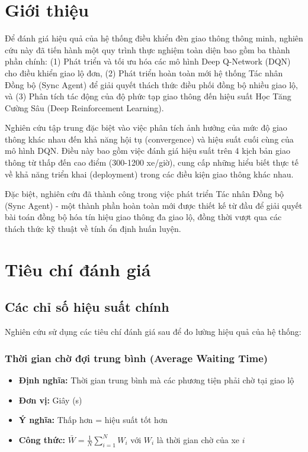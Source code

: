 \section{Giới thiệu}

Để đánh giá hiệu quả của hệ thống điều khiển đèn giao thông thông minh, nghiên
cứu này đã tiến hành một quy trình thực nghiệm toàn diện bao gồm ba thành phần
chính: (1) Phát triển và tối ưu hóa các mô hình Deep Q-Network (DQN) cho điều khiển
giao lộ đơn, (2) Phát triển hoàn toàn mới hệ thống Tác nhân Đồng bộ (Sync Agent) để giải quyết
thách thức điều phối đồng bộ nhiều giao lộ, và (3) Phân tích tác động của độ phức tạp
giao thông đến hiệu suất Học Tăng Cường Sâu (Deep Reinforcement Learning).

Nghiên cứu tập trung đặc biệt vào việc phân tích ảnh hưởng của mức độ giao thông khác nhau
đến khả năng hội tụ (convergence) và hiệu suất cuối cùng của mô hình DQN. Điều này bao gồm việc đánh giá
hiệu suất trên 4 kịch bản giao thông từ thấp đến cao điểm (300-1200 xe/giờ), cung cấp
những hiểu biết thực tế về khả năng triển khai (deployment) trong các điều kiện giao thông khác nhau.

Đặc biệt, nghiên cứu đã thành công trong việc phát triển Tác nhân Đồng bộ (Sync Agent) - một thành phần hoàn toàn
mới được thiết kế từ đầu để giải quyết bài toán đồng bộ hóa tín hiệu giao thông
đa giao lộ, đồng thời vượt qua các thách thức kỹ thuật về tính ổn định huấn luyện.

\section{Tiêu chí đánh giá}

\subsection{Các chỉ số hiệu suất chính}
Nghiên cứu sử dụng các tiêu chí đánh giá sau để đo lường hiệu quả của hệ thống:

\subsubsection{Thời gian chờ đợi trung bình (Average Waiting Time)}
\begin{itemize}
    \item \textbf{Định nghĩa:} Thời gian trung bình mà các phương tiện phải chờ tại giao lộ
    \item \textbf{Đơn vị:} Giây (s)
    \item \textbf{Ý nghĩa:} Thấp hơn = hiệu suất tốt hơn
    \item \textbf{Công thức:} $\bar{W} = \frac{1}{N} \sum_{i=1}^{N} W_i$ với $W_i$ là thời gian chờ của xe $i$
\end{itemize}

